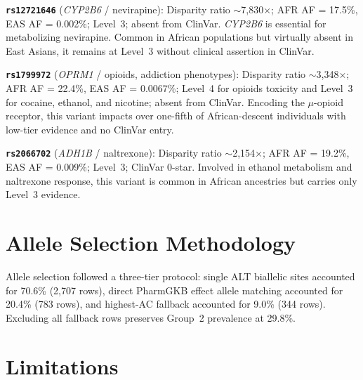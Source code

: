 \documentclass[conference]{IEEEtran}
\begin{document}
\begin{table}[!t]
\textbf{\texttt{rs12721646}} (\textit{CYP2B6} / nevirapine):
Disparity ratio $\sim$7,830$\times$; AFR AF = 17.5\%, EAS AF = 0.002\%; Level~3; absent from ClinVar.
\textit{CYP2B6} is essential for metabolizing nevirapine. Common in African populations but virtually absent in East Asians, it remains at Level~3 without clinical assertion in ClinVar.

\textbf{\texttt{rs1799972}} (\textit{OPRM1} / opioids, addiction phenotypes):
Disparity ratio $\sim$3,348$\times$; AFR AF = 22.4\%, EAS AF = 0.0067\%; Level~4 for opioids toxicity and Level~3 for cocaine, ethanol, and nicotine; absent from ClinVar.
Encoding the $\mu$-opioid receptor, this variant impacts over one-fifth of African-descent individuals with low-tier evidence and no ClinVar entry.

\textbf{\texttt{rs2066702}} (\textit{ADH1B} / naltrexone):
Disparity ratio $\sim$2,154$\times$; AFR AF = 19.2\%, EAS AF = 0.009\%; Level~3; ClinVar 0-star.
Involved in ethanol metabolism and naltrexone response, this variant is common in African ancestries but carries only Level~3 evidence.

\section{Allele Selection Methodology}

Allele selection followed a three-tier protocol: single ALT biallelic sites accounted for 70.6\% (2,707 rows), direct PharmGKB effect allele matching accounted for 20.4\% (783 rows), and highest-AC fallback accounted for 9.0\% (344 rows).
Excluding all fallback rows preserves Group~2 prevalence at 29.8\%.

\section{Limitations}


\end{table}
\end{document}
